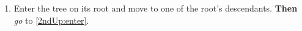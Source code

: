\documentclass[a4paper,12pt]{article}
\begin{document}
\begin{enumerate}
    \item Enter the tree on its root and move to one of the root's descendants. \textbf{Then} \textit{go} to \ref{2ndUp:enter}.




\end{enumerate}
\end{document}
